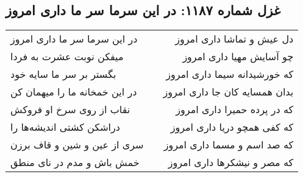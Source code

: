\begin{center}
\section*{غزل شماره ۱۱۸۷: در این سرما سر ما داری امروز}
\label{sec:1187}
\begin{longtable}{l p{0.5cm} r}
در این سرما سر ما داری امروز
&&
دل عیش و تماشا داری امروز
\\
میفکن نوبت عشرت به فردا
&&
چو آسایش مهیا داری امروز
\\
بگستر بر سر ما سایه خود
&&
که خورشیدانه سیما داری امروز
\\
در این خمخانه ما را میهمان کن
&&
بدان همسایه کان جا داری امروز
\\
نقاب از روی سرخ او فروکش
&&
که در پرده حمیرا داری امروز
\\
دراشکن کشتی اندیشه‌ها را
&&
که کفی همچو دریا داری امروز
\\
سری از عین و شین و قاف برزن
&&
که صد اسم و مسما داری امروز
\\
خمش باش و مدم در نای منطق
&&
که مصر و نیشکرها داری امروز
\\
\end{longtable}
\end{center}
